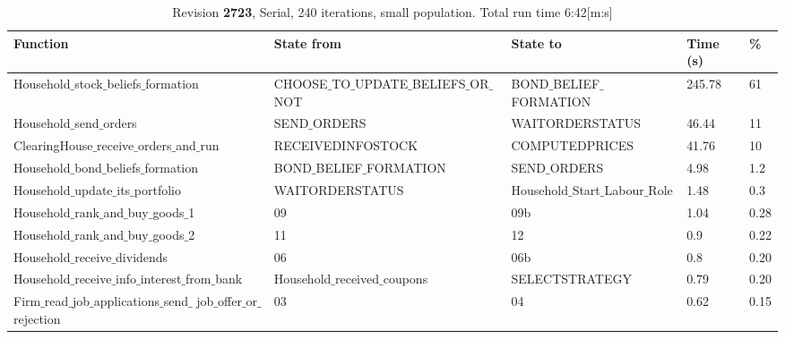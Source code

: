\begin{landscape}
\begin{table}
\begin{tabular}{|l|l|l|l|l|}\hline
Function & State from & State to & Time (s) & \% \\ \hline
Household$\_$stock$\_$beliefs$\_$formation & CHOOSE$\_$TO$\_$UPDATE$\_$BELIEFS$\_$OR$\_$NOT & BOND$\_$BELIEF$\_$FORMATION &  245.78 & 61 \\ \hline
Household$\_$send$\_$orders & SEND$\_$ORDERS & WAITORDERSTATUS &  46.44 & 11 \\ \hline
ClearingHouse$\_$receive$\_$orders$\_$and$\_$run & RECEIVEDINFOSTOCK & COMPUTEDPRICES &  41.76 & 10 \\ \hline
Household$\_$bond$\_$beliefs$\_$formation & BOND$\_$BELIEF$\_$FORMATION &SEND$\_$ORDERS &  4.98 & 1.2 \\ \hline
Household$\_$update$\_$its$\_$portfolio & WAITORDERSTATUS & Household$\_$Start$\_$Labour$\_$Role &  1.48 & 0.3 \\ \hline
Household$\_$rank$\_$and$\_$buy$\_$goods$\_$1 & 09 & 09b &  1.04 & 0.28 \\ \hline
Household$\_$rank$\_$and$\_$buy$\_$goods$\_$2 & 11 & 12 &  0.9 & 0.22 \\ \hline
Household$\_$receive$\_$dividends & 06 & 06b &  0.8 & 0.20 \\ \hline
Household$\_$receive$\_$info$\_$interest$\_$from$\_$bank & Household$\_$received$\_$coupons & SELECTSTRATEGY &  0.79 & 0.20 \\ \hline
\parbox[t]{6cm}{Firm$\_$read$\_$job$\_$applications$\_$send$\_$\\[-4pt]job$\_$offer$\_$or$\_$rejection}  & 03 & 04 &  0.62 & 0.15 \\ \hline
\end{tabular}
\caption{Revision \textbf{2723}, Serial, 240 iterations, small population. Total run time 6:42[m:s]\label{table:r2723}}
\end{table}


\end{landscape}
